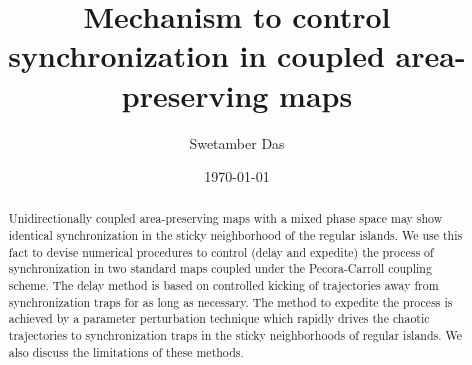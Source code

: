 \documentclass[reprint,amsmath,amssymb,aps,pre]{revtex4-1}
\begin{document}
\title{Mechanism to control synchronization in coupled area-preserving maps}

\author{Swetamber Das}

\date{\today}

\begin{abstract}
Unidirectionally coupled area-preserving maps with a mixed phase space may 
show identical synchronization in the sticky neighborhood of the regular 
islands. We use this fact to devise numerical procedures to 
control (delay and expedite) the process of synchronization in two standard maps coupled under  the Pecora-Carroll coupling scheme. The delay method is based on controlled kicking of trajectories away from synchronization traps for as long as necessary. The method to expedite the process is achieved by a parameter perturbation technique which rapidly drives the chaotic trajectories to synchronization traps in the sticky neighborhoods 
of regular islands. We also discuss the limitations of these methods.
\end{abstract}


\maketitle
\end{document}
